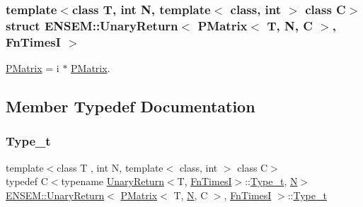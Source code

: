 \subsubsection*{template$<$class T, int N, template$<$ class, int $>$ class C$>$\newline
struct E\+N\+S\+E\+M\+::\+Unary\+Return$<$ P\+Matrix$<$ T, N, C $>$, Fn\+Times\+I $>$}

\mbox{\hyperlink{classENSEM_1_1PMatrix}{P\+Matrix}} = i $\ast$ \mbox{\hyperlink{classENSEM_1_1PMatrix}{P\+Matrix}}. 

\subsection{Member Typedef Documentation}
\mbox{\label{structENSEM_1_1UnaryReturn_3_01PMatrix_3_01T_00_01N_00_01C_01_4_00_01FnTimesI_01_4_aab89467172d831a392a305ca7f49772e}} 
\subsubsection{\texorpdfstring{Type\_t}{Type\_t}\hspace{0.1cm}{\footnotesize\ttfamily [1/2]}}
{\footnotesize\ttfamily template$<$class T , int N, template$<$ class, int $>$ class C$>$ \\
typedef C$<$typename \mbox{\hyperlink{structENSEM_1_1UnaryReturn}{Unary\+Return}}$<$T, \mbox{\hyperlink{structENSEM_1_1FnTimesI}{Fn\+TimesI}}$>$\+::\mbox{\hyperlink{structENSEM_1_1UnaryReturn_3_01PMatrix_3_01T_00_01N_00_01C_01_4_00_01FnTimesI_01_4_aab89467172d831a392a305ca7f49772e}{Type\+\_\+t}}, \mbox{\hyperlink{operator__name__util_8cc_a7722c8ecbb62d99aee7ce68b1752f337}{N}}$>$ \mbox{\hyperlink{structENSEM_1_1UnaryReturn}{E\+N\+S\+E\+M\+::\+Unary\+Return}}$<$ \mbox{\hyperlink{classENSEM_1_1PMatrix}{P\+Matrix}}$<$ T, \mbox{\hyperlink{operator__name__util_8cc_a7722c8ecbb62d99aee7ce68b1752f337}{N}}, C $>$, \mbox{\hyperlink{structENSEM_1_1FnTimesI}{Fn\+TimesI}} $>$\+::\mbox{\hyperlink{structENSEM_1_1UnaryReturn_3_01PMatrix_3_01T_00_01N_00_01C_01_4_00_01FnTimesI_01_4_aab89467172d831a392a305ca7f49772e}{Type\+\_\+t}}}

